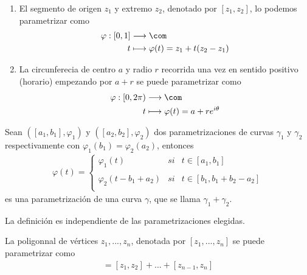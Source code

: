 \begin{ejemplo}
\begin{enumerate}
    \item El segmento de origen $z_1$ y extremo $z_2$, denotado por $[z_1,z_2]$, lo podemos parametrizar como
    \begin{align*}
        \varphi : [0,1] &\longrightarrow \com \\
        t & \longmapsto \varphi(t) = z_1 + t(z_2 - z_1)
    \end{align*}
    \item La circunferecia de centro $a$ y radio $r$ recorrida una vez en sentido positivo (horario) empezando por $a+r$ se puede parametrizar como
    \begin{align*}
        \varphi : [0,2\pi) &\longrightarrow \com \\
        t & \longmapsto \varphi(t) = a + re^{i\theta}
    \end{align*}
\end{enumerate}
\end{ejemplo}

\begin{defi}
Sean $([a_1,b_1],\varphi_1)$ y $([a_2,b_2],\varphi_2)$ dos parametrizaciones de curvas $\gamma_1$ y $\gamma_2$ respectivamente con $\varphi_1(b_1) = \varphi_2(a_2)$, entonces
\begin{align*}
    \varphi(t) = \left\{ \begin{array}{lcc}
             \varphi_1(t) &  si  & t \in [a_1,b_1]\\
             \\ \varphi_2(t-b_1+a_2) &  si &t \in [b_1,b_1 + b_2 - a_2] \\
             \end{array}
   \right.
\end{align*}
es una parametrización de una curva $\gamma$, que se llama $\gamma_1 + \gamma_2$.
\end{defi}

\begin{obs}
La definición es independiente de las parametrizaciones elegidas.
\end{obs}

\begin{ejemplo}
La poligonnal de vértices $z_1,...,z_n$, denotada por $[z_1,...,z_n]$ se puede parametrizar como
    \begin{align*}
        [z_1,...,z_n] = [z_1,z_2] + ... + [z_{n-1},z_n]
    \end{align*}
\end{ejemplo}

